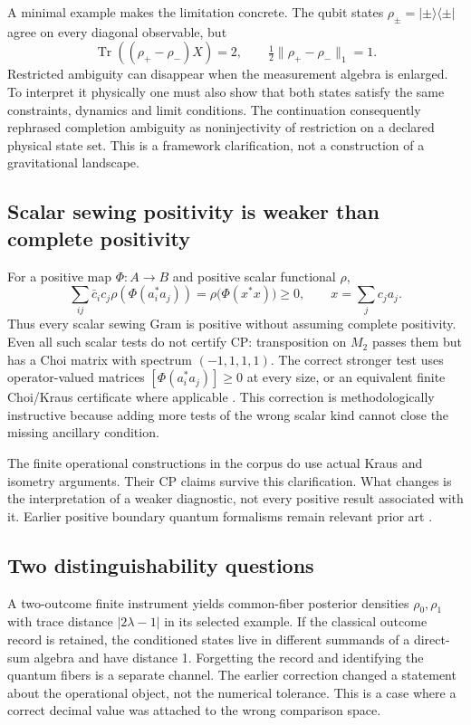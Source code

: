 \documentclass[11pt,a4paper]{article}
\begin{document}
A minimal example makes the limitation concrete. The qubit states
$\rho_\pm=|\pm\rangle\langle\pm|$ agree on every diagonal observable, but
\begin{equation}
\operatorname{Tr}((\rho_+-\rho_-)X)=2,
\qquad \tfrac12\|\rho_+-\rho_-\|_1=1.
\end{equation}
Restricted ambiguity can disappear when the measurement algebra is enlarged.
To interpret it physically one must also show that both states satisfy the
same constraints, dynamics and limit conditions. The continuation consequently
rephrased completion ambiguity as noninjectivity of restriction on a declared
physical state set. This is a framework clarification, not a construction of
a gravitational landscape.

\subsection{Scalar sewing positivity is weaker than complete positivity}
For a positive map $\Phi:A\to B$ and positive scalar functional $\rho$,
\begin{equation}
\sum_{ij}\bar c_i c_j\rho(\Phi(a_i^*a_j))
=\rho\bigl(\Phi(x^*x)\bigr)\geq0,\qquad x=\sum_jc_ja_j.
\end{equation}
Thus every scalar sewing Gram is positive without assuming complete
positivity. Even all such scalar tests do not certify CP: transposition on
$M_2$ passes them but has a Choi matrix with spectrum $(-1,1,1,1)$.
The correct stronger test uses operator-valued matrices
$[\Phi(a_i^*a_j)]\geq0$ at every size, or an equivalent finite Choi/Kraus
certificate where applicable \cite{Stinespring1955,Choi1975}.
This correction is methodologically instructive because adding more tests
of the wrong scalar kind cannot close the missing ancillary condition.

The finite operational constructions in the corpus do use actual Kraus and
isometry arguments. Their CP claims survive this clarification. What changes
is the interpretation of a weaker diagnostic, not every positive result
associated with it. Earlier positive boundary quantum formalisms remain
relevant prior art \cite{Oeckl2013}.

\subsection{Two distinguishability questions}
A two-outcome finite instrument yields common-fiber posterior densities
$\rho_0,\rho_1$ with trace distance $|2\lambda-1|$ in its selected example.
If the classical outcome record is retained, the conditioned states live in
different summands of a direct-sum algebra and have distance 1. Forgetting
the record and identifying the quantum fibers is a separate channel.
The earlier correction changed a statement about the operational object,
not the numerical tolerance. This is a case where a correct decimal value
was attached to the wrong comparison space.
\end{document}
